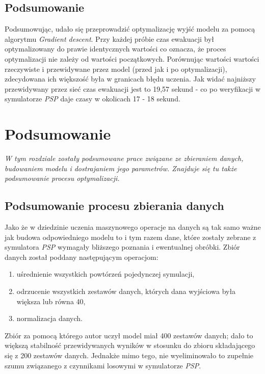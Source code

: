 \documentclass[12pt]{aghdpl}
\begin{document}
		\section{Podsumowanie}
		Podsumowując, udało się przeprowadzić optymalizację wyjść modelu za pomocą algorytmu \textit{Gradient descent}. Przy każdej próbie czas ewakuacji był optymalizowany do prawie identycznych wartości co oznacza, że proces optymalizacji nie zależy od wartości początkowych. Porównując wartości wartości rzeczywiste i przewidywane przez model (przed jak i po optymalizacji), zdecydowana ich większość była w granicach błędu uczenia. Jak widać najniższy przewidywany przez sieć czas ewakuacji jest to 19,57 sekund - co po weryfikacji w symulatorze \textit{PSP} daje czasy w okolicach 17 - 18 sekund.
		
	\chapter{Podsumowanie}
	\textit{W tym rozdziale zostały podsumowane prace związane ze zbieraniem danych, budowaniem modelu i dostrajaniem jego parametrów. Znajduje się tu także podsumowanie procesu optymalizacji.}	
	
		\section{Podsumowanie procesu zbierania danych}
		Jako że w dziedzinie uczenia maszynowego operacje na danych są tak samo ważne jak budowa odpowiedniego modelu to i tym razem dane, które zostały zebrane z symulatora \textit{PSP} wymagały bliższego poznania i ewentualnej obróbki. Zbiór danych został poddany następującym operacjom:
		\begin{enumerate}
		\item uśrednienie wszystkich powtórzeń pojedynczej symulacji,
		\item odrzucenie wszystkich zestawów danych, których dana wyjściowa była większa lub równa 40,
		\item normalizacja danych.		
		\end{enumerate}
		
		Zbiór za pomocą którego autor uczył model miał 400 zestawów danych; dało to większą stabilność przewidywanych wyników w stosunku do zbioru składającego się z 200 zestawów danych. Jednakże mimo tego, nie wyeliminowało to zupełnie szumu związanego z czynnikami losowymi w symulatorze \textit{PSP}.
		
\end{document}
